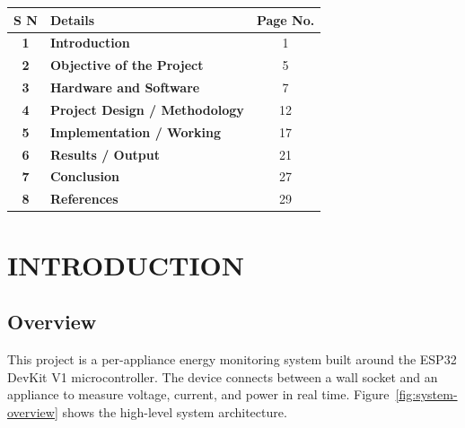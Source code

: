 \documentclass[12pt, a4paper]{article}
\begin{document}
	\renewcommand{\arraystretch}{2} %
	\begin{center}
		\begin{tabular}{|c|p{}|c|}
			\hline
			\textbf{S N} & \textbf{Details} & \textbf{Page No.} \\ \hline
			\textbf{1} & \textbf{Introduction} & 1 \\ \hline
			\textbf{2} & \textbf{Objective of the Project} & 5 \\ \hline
			\textbf{3} & \textbf{Hardware and Software} & 7 \\ \hline
			\textbf{4} & \textbf{Project Design / Methodology} & 12 \\ \hline
			\textbf{5} & \textbf{Implementation / Working} & 17 \\ \hline
			\textbf{6} & \textbf{Results / Output} & 21 \\ \hline
			\textbf{7} & \textbf{Conclusion} & 27 \\ \hline
			\textbf{8} & \textbf{References} & 29 \\ \hline
		\end{tabular}
	\end{center}
	\renewcommand{\arraystretch}{1} %
	
	
	\newpage
	
	\pagestyle{fancy}
	\setcounter{page}{1}
	
	\section{INTRODUCTION}
	
	\subsection{Overview}
	
	This project is a per-appliance energy monitoring system built around the ESP32 DevKit V1 microcontroller. The device connects between a wall socket and an appliance to measure voltage, current, and power in real time. Figure~\ref{fig:system-overview} shows the high-level system architecture.
	
\end{document}
